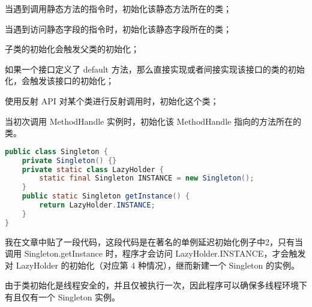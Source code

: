\documentclass[../../../interview-questions.tex]{subfiles}
\begin{document}
当遇到调用静态方法的指令时，初始化该静态方法所在的类；

当遇到访问静态字段的指令时，初始化该静态字段所在的类；

子类的初始化会触发父类的初始化；

如果一个接口定义了 default 方法，那么直接实现或者间接实现该接口的类的初始化，会触发该接口的初始化；

使用反射 API 对某个类进行反射调用时，初始化这个类；

当初次调用 MethodHandle 实例时，初始化该 MethodHandle 指向的方法所在的类。

\begin{lstlisting}[language=Java]
public class Singleton {
    private Singleton() {}
    private static class LazyHolder {
        static final Singleton INSTANCE = new Singleton();
    }
    public static Singleton getInstance() {
        return LazyHolder.INSTANCE;
    }
}
\end{lstlisting}

我在文章中贴了一段代码，这段代码是在著名的单例延迟初始化例子中2，只有当调用 Singleton.getInstance 时，程序才会访问 LazyHolder.INSTANCE，才会触发对 LazyHolder 的初始化（对应第 4 种情况），继而新建一个 Singleton 的实例。

由于类初始化是线程安全的，并且仅被执行一次，因此程序可以确保多线程环境下有且仅有一个 Singleton 实例。
\end{document}
